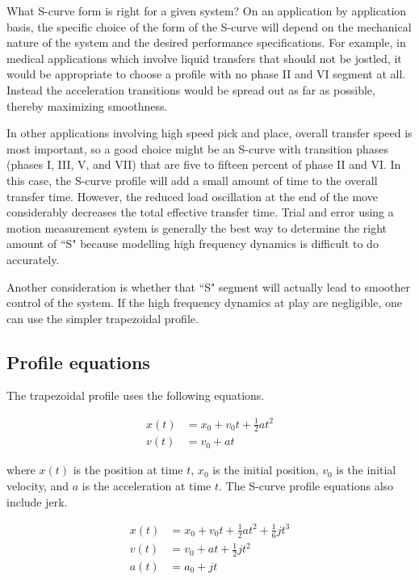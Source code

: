 What S-curve form is right for a given system? On an application by application
basis, the specific choice of the form of the S-curve will depend on the
mechanical nature of the system and the desired performance specifications. For
example, in medical applications which involve liquid transfers that should not
be jostled, it would be appropriate to choose a profile with no phase II and VI
segment at all. Instead the acceleration transitions would be spread out as far
as possible, thereby maximizing smoothness.

In other applications involving high speed pick and place, overall transfer
speed is most important, so a good choice might be an S-curve with transition
phases (phases I, III, V, and VII) that are five to fifteen percent of phase II
and VI. In this case, the S-curve profile will add a small amount of time to the
overall transfer time. However, the reduced load oscillation at the end of the
move considerably decreases the total effective transfer time. Trial and error
using a motion measurement system is generally the best way to determine the
right amount of ``S" because modelling high frequency dynamics is difficult to
do accurately.

Another consideration is whether that ``S" segment will actually lead to
smoother control of the system. If the high frequency dynamics at play are
negligible, one can use the simpler trapezoidal profile.

\subsection{Profile equations}

The trapezoidal profile uses the following equations.

\begin{align*}
  x(t) &= x_0 + v_0t + \frac{1}{2}at^2 \\
  v(t) &= v_0 + at
\end{align*}

where $x(t)$ is the position at time $t$, $x_0$ is the initial position, $v_0$
is the initial velocity, and $a$ is the acceleration at time $t$. The S-curve
profile equations also include jerk.

\begin{align*}
  x(t) &= x_0 + v_0t + \frac{1}{2}at^2 + \frac{1}{6}jt^3 \\
  v(t) &= v_0 + at + \frac{1}{2}jt^2 \\
  a(t) &= a_0 + jt
\end{align*}

